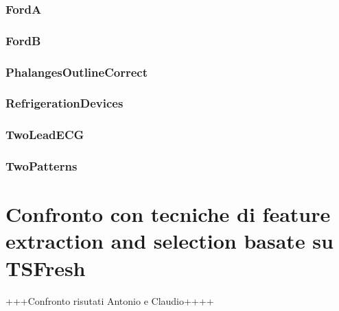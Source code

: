 \subsubsection{FordA}

\subsubsection{FordB}

\subsubsection{PhalangesOutlineCorrect}

\subsubsection{RefrigerationDevices}

\subsubsection{TwoLeadECG}

\subsubsection{TwoPatterns}

\section{Confronto con tecniche di feature extraction and selection basate su TSFresh}
+++Confronto risutati Antonio e Claudio++++
